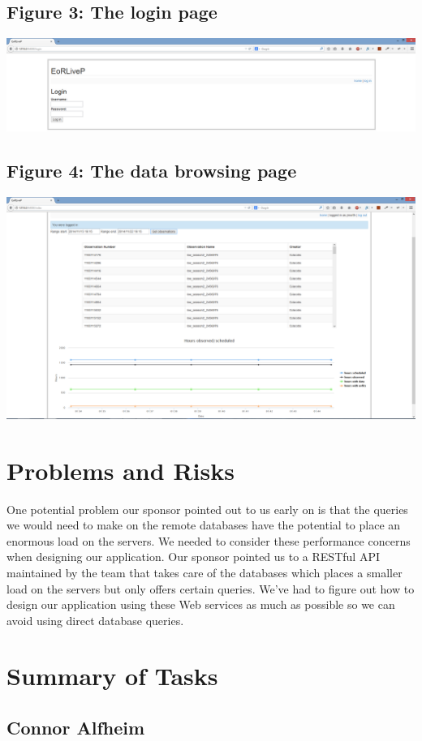 \documentclass[12pt]{article}
\begin{document}
\begin{spacing}{1.5}
\subsection{Figure 3: The login page}
\includegraphics[width=\textwidth]{screenshot1}

\subsection{Figure 4: The data browsing page}
\includegraphics[width=\textwidth]{screenshot2}
\section{Problems and Risks}
One potential problem our sponsor pointed out to us early on is that the queries we would need to make on the remote databases have the potential to place an enormous load on the servers. We needed to consider these performance concerns when designing our application. Our sponsor pointed us to a RESTful API maintained by the team that takes care of the databases which places a smaller load on the servers but only offers certain queries. We've had to figure out how to design our application using these Web services as much as possible so we can avoid using direct database queries.
\clearpage
\section{Summary of Tasks}

\subsection{Connor Alfheim}

\end{spacing}
\end{document}
